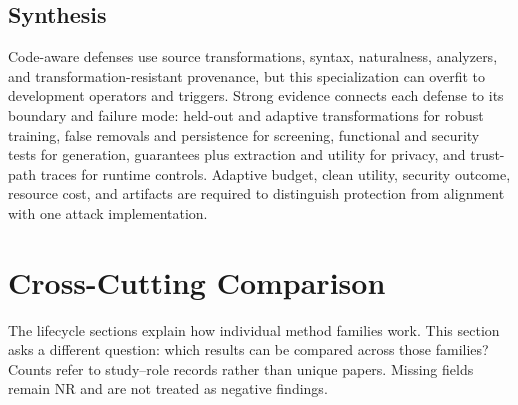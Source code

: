 \documentclass[acmsmall,screen,review]{acmart}
\begin{document}
\subsection{Synthesis} \label{sec:defense:discussion}
Code-aware defenses use source transformations, syntax, naturalness, analyzers, and transformation-resistant provenance, but this specialization can overfit to development operators and triggers. Strong evidence connects each defense to its boundary and failure mode: held-out and adaptive transformations for robust training, false removals and persistence for screening, functional and security tests for generation, guarantees plus extraction and utility for privacy, and trust-path traces for runtime controls. Adaptive budget, clean utility, security outcome, resource cost, and artifacts are required to distinguish protection from alignment with one attack implementation.

\section{Cross-Cutting Comparison} \label{sec:synthesis}

The lifecycle sections explain how individual method families work. This section asks a different question: which results can be compared across those families? Counts refer to study--role records rather than unique papers. Missing fields remain \textsf{NR} and are not treated as negative findings.
\end{document}
